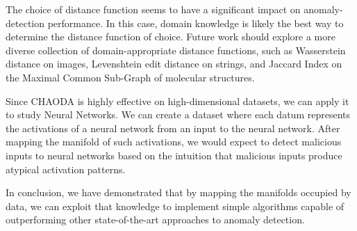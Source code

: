 
The choice of distance function seems to have a significant impact on anomaly-detection performance.
In this case, domain knowledge is likely the best way to determine the distance function of choice.
Future work should explore a more diverse collection of domain-appropriate distance functions, such as Wasserstein distance on images, Levenshtein edit distance on strings, and Jaccard Index on the Maximal Common Sub-Graph of molecular structures.

Since CHAODA is highly effective on high-dimensional datasets, we can apply it to study Neural Networks.
We can create a dataset where each datum represents the activations of a neural network from an input to the neural network.
After mapping the manifold of such activations, we would expect to detect malicious inputs to neural networks based on the intuition that malicious inputs produce atypical activation patterns.


In conclusion, we have demonstrated that by mapping the manifolds occupied by data, we can exploit that knowledge to implement simple algorithms capable of outperforming other state-of-the-art approaches to anomaly detection.

